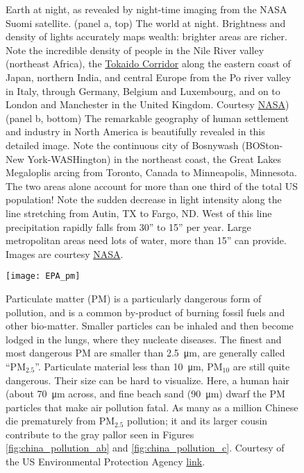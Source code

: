 \documentclass[amstex,12pt]{book}
\newcommand{\textsub}[1]{$_{\text{#1}}$}
\begin{document}
\newpage
\begin{figure}[p]
\centering
{}


\caption{Earth at night, as revealed by night-time imaging from the NASA Suomi satellite. (panel a, top) The world at night. Brightness and density of lights accurately maps wealth: brighter areas are richer. Note the incredible density of people in the Nile River valley (northeast Africa), the  \href{https://people.hofstra.edu/geotrans/eng/ch6en/appl6en/tokaido.html}{Tokaido Corridor} along the eastern coast of Japan, northern India, and central Europe from the Po river valley in Italy, through Germany, Belgium and Luxembourg, and on to London and Manchester in the United Kingdom.  Courtesy \href{http://eoimages.gsfc.nasa.gov/images/imagerecords/79000/79765/dnb_land_ocean_ice.2012.3600x1800.jpg}{NASA}) (panel b, bottom) The remarkable geography of human settlement and industry in  North America is beautifully revealed in this detailed image. Note the continuous city of Bosnywash (BOSton-New York-WASHington) in the northeast coast, the Great Lakes Megaloplis arcing from Toronto, Canada to Minneapolis, Minnesota. The two areas alone account for more than one third of the total US population! Note the sudden decrease in light intensity along the line stretching from Autin, TX to Fargo, ND. West of this line  precipitation rapidly falls from 30'' to 15'' per year. Large metropolitan areas need lots of water, more than 15'' can provide. Images are courtesy \href{https://www.nasa.gov/sites/default/files/images/712129main_8247975848_88635d38a1_o.jpg}{NASA}.}

\label{fig:world_night_ab}
\end{figure}
 
\newpage
\begin{figure}[p]
\centering
\texttt{[image: EPA\_pm]}%

\caption{Particulate matter (PM) is a particularly dangerous form of pollution, and is a common by-product of burning fossil fuels and other bio-matter. Smaller particles can be inhaled and then become lodged in the lungs, where they nucleate diseases. The finest and most dangerous PM are smaller than \SI{2.5}{\micro\meter}, are generally called ``PM\textsub{2.5}''. Particulate material less than \SI{10}{\micro\meter}, PM\textsub{10} are still quite dangerous. Their size can be hard to visualize. Here, a human hair (about \SI{70}{\micro\meter} across, and fine beach sand (\SI{90}{\micro\meter}) dwarf the PM particles that make air pollution fatal. As many as a million Chinese die prematurely from PM\textsub{2.5} pollution; it and its larger cousin contribute to the gray pallor seen in Figures \ref{fig:china_pollution_ab} and \ref{fig:china_pollution_c}. Courtesy of the US Environmental Protection Agency \href{https://www.epa.gov/sites/production/files/2016-09/pm2.5_scale_graphic-color_2.jpg}{link}.}

\label{fig:EPA_pm}

\end{figure}
\end{document}
